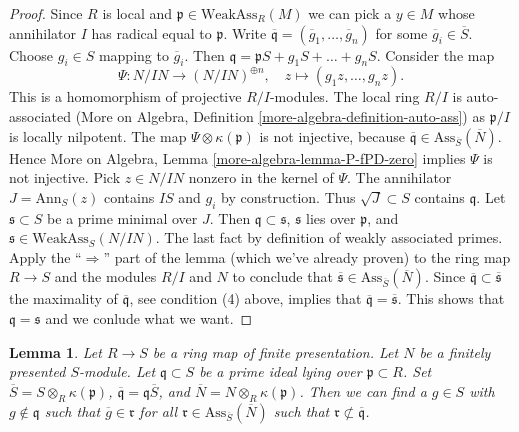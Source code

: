 \documentclass{amsart}
\theoremstyle{plain}
\newtheorem{lemma}[subsection]{Lemma}
\theoremstyle{definition}
\theoremstyle{remark}
\numberwithin{equation}{subsection}
\begin{document}
\begin{proof}
\medskip\noindent
Since $R$ is local and $\mathfrak p \in \text{WeakAss}_R(M)$
we can pick a $y \in M$ whose annihilator $I$ has radical
equal to $\mathfrak p$.
Write $\overline{\mathfrak q} = (\overline{g}_1, \ldots, \overline{g}_n)$
for some $\overline{g}_i \in \overline{S}$. Choose $g_i \in S$
mapping to $\overline{g}_i$.
Then $\mathfrak q = \mathfrak pS + g_1S + \ldots + g_nS$.
Consider the map
$$
\Psi : N/IN \longrightarrow (N/IN)^{\oplus n}, \quad
z \longmapsto (g_1z, \ldots, g_nz).
$$
This is a homomorphism of projective $R/I$-modules.
The local ring $R/I$ is auto-associated
(More on Algebra, Definition \ref{more-algebra-definition-auto-ass})
as $\mathfrak p/I$ is locally nilpotent.
The map $\Psi \otimes \kappa(\mathfrak p)$ is not injective, because
$\overline{\mathfrak q} \in \text{Ass}_{\overline{S}}(\overline{N})$.
Hence More on Algebra, Lemma \ref{more-algebra-lemma-P-fPD-zero}
implies $\Psi$ is not injective. Pick $z \in N/IN$
nonzero in the kernel of $\Psi$. The annihilator $J = \text{Ann}_S(z)$
contains $IS$ and $g_i$ by construction. Thus
$\sqrt{J} \subset S$ contains $\mathfrak q$.
Let $\mathfrak s \subset S$ be a prime minimal over $J$.
Then $\mathfrak q \subset \mathfrak s$,
$\mathfrak s$ lies over $\mathfrak p$, and
$\mathfrak s \in \text{WeakAss}_S(N/IN)$.
The last fact by definition of weakly associated primes.
Apply the ``$\Rightarrow$'' part of the lemma (which we've already proven)
to the ring map $R \to S$ and the modules $R/I$ and $N$
to conclude that
$\overline{\mathfrak s} \in \text{Ass}_{\overline{S}}(\overline{N})$.
Since $\overline{\mathfrak q} \subset \overline{\mathfrak s}$
the maximality of $\overline{\mathfrak q}$, see condition (4) above,
implies that $\overline{\mathfrak q} = \overline{\mathfrak s}$.
This shows that $\mathfrak q = \mathfrak s$ and we conlude
what we want.
\end{proof}


\begin{lemma}
\label{lemma-weak-bourbaki-pre-pre}
Let $R \to S$ be a ring map of finite presentation. Let $N$ be a
finitely presented $S$-module. Let $\mathfrak q \subset S$ be a prime ideal
lying over $\mathfrak p \subset R$. Set
$\overline{S} = S \otimes_R \kappa(\mathfrak p)$,
$\overline{\mathfrak q} = \mathfrak q \overline{S}$, and
$\overline{N} = N \otimes_R \kappa(\mathfrak p)$. Then
we can find a $g \in S$ with
$g \not \in \mathfrak q$ such that
$\overline{g} \in \mathfrak r$ for all
$\mathfrak r \in \text{Ass}_{\overline{S}}(\overline{N})$
such that $\mathfrak r \not \subset \overline{\mathfrak q}$.
\end{lemma}
\end{document}
